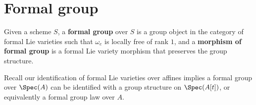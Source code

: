 \section{Formal group}\label{sec:formalgroups-formalgroup}
\begin{definition}
    Given a scheme $S$, a \textbf{formal group} over $S$ is a group object in the category of formal Lie varieties such that $\omega_e$ is locally free of rank $1$, and a \textbf{morphism of formal group} is a formal Lie variety morphism that preserves the group structure.
\end{definition}

\begin{remark}
    Recall our identification of formal Lie varieties over affines implies a formal group over $\Spec(A)$ can be identified with a group structure on $\Spec(A[t])$, or equivalently a formal group law over $A$.
\end{remark}